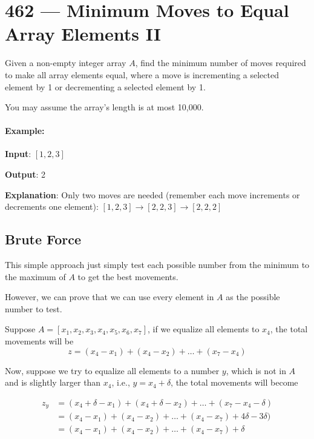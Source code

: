 \section{462 --- Minimum Moves to Equal Array Elements II}
Given a non-empty integer array $A$, find the minimum number of moves required to make all array elements equal, where a move is incrementing a selected element by 1 or decrementing a selected element by 1.

You may assume the array's length is at most 10,000.

\paragraph{Example:}

\begin{flushleft}
\textbf{Input}: $[1,2,3]$

\textbf{Output}: 2

\textbf{Explanation}: Only two moves are needed (remember each move increments or decrements one element): $[1,2,3]  \longrightarrow  [2,2,3]  \longrightarrow  [2,2,2]$

\end{flushleft}

\subsection{Brute Force}
This simple approach just simply test each possible number from the minimum to the maximum of $A$ to get the best movements.

However, we can prove that we can use every element in $A$ as the possible number to test. 

Suppose $A=[x_1, x_2, x_3, x_4, x_5, x_6, x_7]$, if we equalize all elements to $x_4$, the total movements will be 
 \[
 z = (x_4-x_1) + (x_4-x_2) + \ldots +(x_7-x_4)
 \]
 
Now, suppose we try to equalize all elements to a number $y$, which is not in $A$ and is slightly larger than $x_4$, i.e., $y=x_4+\delta$, the total movements will become

\begin{align*}
z_y &= (x_4+\delta - x_1) + (x_4+\delta-x_2) + \ldots + (x_7-x_4-\delta) \\
    & = (x_4-x_1) + (x_4-x_2) + \ldots + (x_4-x_7) + 4\delta - 3\delta) \\
    & = (x_4-x_1) + (x_4-x_2) + \ldots + (x_4-x_7) + \delta
\end{align*}

